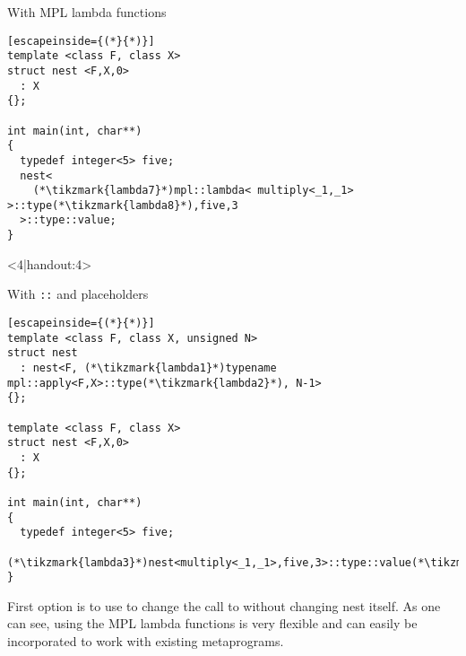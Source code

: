 \documentclass[11pt,a4paper,dvipsnames,usenames]{beamer}
\begin{document}
\begin{frame}[fragile]
\begin{onlyenv}
\begin{exampleblock}{With MPL lambda functions}
\begin{lstlisting}[escapeinside={(*}{*)}]
template <class F, class X>
struct nest <F,X,0>
  : X
{};

int main(int, char**)
{
  typedef integer<5> five;
  nest<
    (*\tikzmark{lambda7}*)mpl::lambda< multiply<_1,_1> >::type(*\tikzmark{lambda8}*),five,3
  >::type::value;
}
  \end{lstlisting}
  \end{exampleblock}


  \end{onlyenv}

  \begin{onlyenv}<4|handout:4>
    \begin{exampleblock}{With {\texttt{::}} {\color{OliveGreen} and placeholders}}
  \begin{lstlisting}[escapeinside={(*}{*)}]
template <class F, class X, unsigned N>
struct nest
  : nest<F, (*\tikzmark{lambda1}*)typename mpl::apply<F,X>::type(*\tikzmark{lambda2}*), N-1>
{};

template <class F, class X>
struct nest <F,X,0>
  : X
{};

int main(int, char**)
{
  typedef integer<5> five;
  (*\tikzmark{lambda3}*)nest<multiply<_1,_1>,five,3>::type::value(*\tikzmark{lambda4}*);
}
  \end{lstlisting}
  \end{exampleblock}


  \end{onlyenv}

  {
    First option is to use  to change the call to  without changing nest itself.
    As one can see, using the MPL lambda functions is very flexible and can easily be incorporated to work with
    existing metaprograms.

}
\end{frame}
\end{document}
